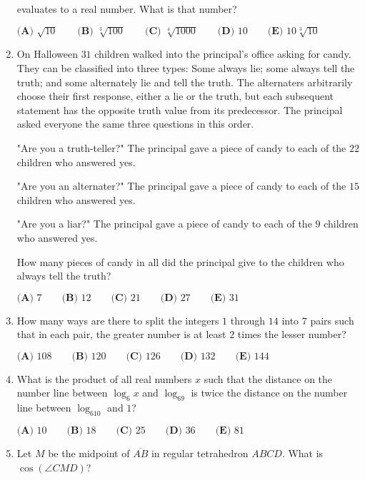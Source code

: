 \documentclass{article}
\begin{document}
\begin{enumerate}[label=\arabic*., itemsep=0.5em]
evaluates to a real number. What is that number?

$\textbf{(A) }\sqrt{10}\qquad\textbf{(B) }\sqrt[3]{100}\qquad\textbf{(C) }\sqrt[4]{1000}\qquad\textbf{(D) }10\qquad\textbf{(E) }10\sqrt[3]{10}$\par \vspace{0.5em}\item On Halloween $31$ children walked into the principal's office asking for candy. They
can be classified into three types: Some always lie; some always tell the truth; and
some alternately lie and tell the truth. The alternaters arbitrarily choose their first
response, either a lie or the truth, but each subsequent statement has the opposite
truth value from its predecessor. The principal asked everyone the same three
questions in this order.

"Are you a truth-teller?" The principal gave a piece of candy to each of the $22$
children who answered yes.

"Are you an alternater?" The principal gave a piece of candy to each of the $15$
children who answered yes.

"Are you a liar?" The principal gave a piece of candy to each of the $9$ children who
answered yes.

How many pieces of candy in all did the principal give to the children who always
tell the truth?

$\textbf{(A) } 7 \qquad \textbf{(B) } 12 \qquad \textbf{(C) } 21 \qquad \textbf{(D) } 27 \qquad \textbf{(E) } 31$\par \vspace{0.5em}\item How many ways are there to split the integers $1$ through $14$ into $7$ pairs such that in each pair, the greater number is at least $2$ times the lesser number?

$\textbf{(A) } 108 \qquad \textbf{(B) } 120 \qquad \textbf{(C) } 126 \qquad \textbf{(D) } 132 \qquad \textbf{(E) } 144$\par \vspace{0.5em}\item What is the product of all real numbers $x$ such that the distance on the number line between $\log_6x$ and $\log_69$ is twice the distance on the number line between $\log_610$ and $1$?

$\textbf{(A) } 10 \qquad \textbf{(B) } 18 \qquad \textbf{(C) } 25 \qquad \textbf{(D) } 36 \qquad \textbf{(E) } 81$\par \vspace{0.5em}\item Let $M$ be the midpoint of $\overline{AB}$ in regular tetrahedron $ABCD$. What is $\cos(\angle CMD)$?


\end{enumerate}
\end{document}
